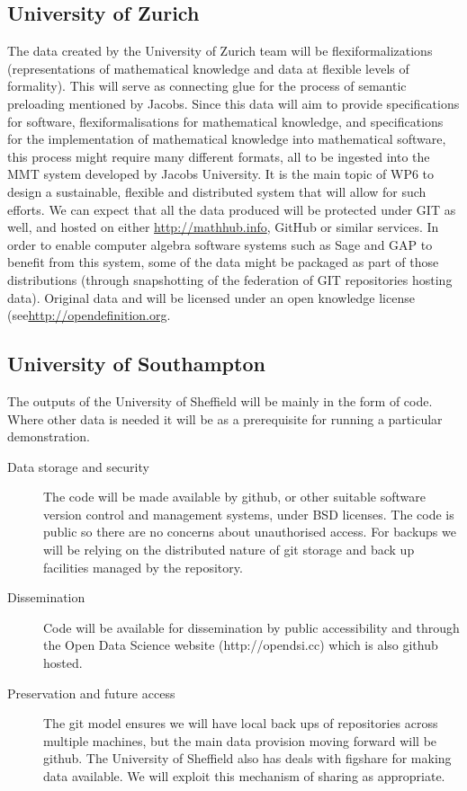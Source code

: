 \documentclass[12pt]{article}
\begin{document}
\subsection{University of Zurich}
The data created by the University of Zurich team will be flexiformalizations (representations of mathematical knowledge and data at flexible levels of formality). 
This will serve as connecting glue for the process of semantic preloading mentioned by Jacobs. 
Since this data will aim to provide specifications for software, flexiformalisations for mathematical knowledge, and specifications for the implementation of mathematical knowledge into mathematical software, this process might require many different formats, all to be ingested into the MMT system developed by Jacobs University. 
It is the main topic of WP6 to design a sustainable, flexible and distributed system that will allow for such efforts. We can expect that all the data produced will be protected under GIT as well, and hosted on either \url{http://mathhub.info}, GitHub or similar services. 
In order to enable computer algebra software systems such as Sage and GAP to benefit from this system, some of the data might be packaged as part of those distributions (through snapshotting of the federation of GIT repositories hosting data).
Original data and will be licensed under an open knowledge license (see\url{http://opendefinition.org}.

\subsection{University of Southampton}

The outputs of the University of Sheffield will be mainly in the form of code. Where other data is needed it will be as a prerequisite for running a particular demonstration. 
\begin{description}
\item[Data storage and security] The code will be made available by github, or other suitable software version control and management systems, under BSD licenses. The code is public so there are no concerns about unauthorised access. For backups we will be relying on the distributed nature of git storage and back up facilities managed by the repository.

\item[Dissemination] Code will be available for dissemination by public accessibility and through the Open Data Science website (http://opendsi.cc) which is also github hosted.

\item[Preservation and future access] The git model ensures we will have local back ups of repositories across multiple machines, but the main data provision moving forward will be github. The University of Sheffield also has deals with figshare for making data available. We will exploit this mechanism of sharing as appropriate.
\end{description}
\end{document}
